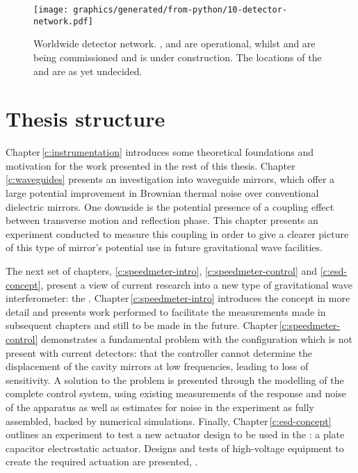 \begin{figure}
  \centering
  \texttt{[image: graphics/generated/from-python/10-detector-network.pdf]}
  \caption[Worldwide detector network]{\label{fig:detector-network}Worldwide detector network. \GEO{}, \LHO{} and \LLO{} are operational, whilst \VIRGO{} and \KAGRA{} are being commissioned and \INDIGO{} is under construction. The locations of the \ET{} and \LIGOCE{} are as yet undecided.}
\end{figure}

\section{Thesis structure}
Chapter\,\ref{c:instrumentation} introduces some theoretical foundations and motivation for the work presented in the rest of this thesis. Chapter\,\ref{c:waveguides} presents an investigation into waveguide mirrors, which offer a large potential improvement in Brownian thermal noise over conventional dielectric mirrors. One downside is the potential presence of a coupling effect between transverse motion and reflection phase. This chapter presents an experiment conducted to measure this coupling in order to give a clearer picture of this type of mirror's potential use in future gravitational wave facilities.

The next set of chapters, \ref{c:speedmeter-intro}, \ref{c:speedmeter-control} and \ref{c:esd-concept}, present a view of current research into a new type of gravitational wave interferometer: the \SSM{}. Chapter\,\ref{c:speedmeter-intro} introduces the concept in more detail and presents work performed to facilitate the measurements made in subsequent chapters and still to be made in the future. Chapter\,\ref{c:speedmeter-control} demonstrates a fundamental problem with the \SSM{} configuration which is not present with current detectors: that the controller cannot determine the displacement of the cavity mirrors at low frequencies, leading to loss of sensitivity. A solution to the problem is presented through the modelling of the complete control system, using existing measurements of the response and noise of the apparatus as well as estimates for noise in the experiment as fully assembled, backed by numerical simulations. Finally, Chapter\,\ref{c:esd-concept} outlines an experiment to test a new actuator design to be used in the \SSMEXPT{}: a plate capacitor electrostatic actuator. Designs and tests of high-voltage equipment to create the required actuation are presented, .

